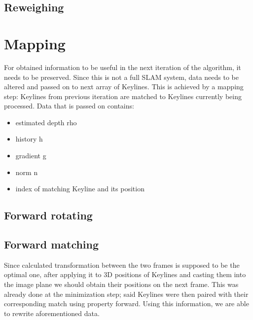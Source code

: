 \subsection{Reweighing}


\section{Mapping}

For obtained information to be useful in the next iteration of the algorithm, it needs to be preserved. Since this is not a full SLAM system, data needs to be altered and passed on to next array of Keylines. This is achieved by a mapping step: Keylines from previous iteration are matched to Keylines currently being processed. Data that is passed on contains:

\begin{itemize}
	\item estimated depth rho
	\item history h
	\item gradient g
	\item norm n
	\item index of matching Keyline and its position
\end{itemize}

\subsection{Forward rotating}

%
%
%

\subsection{Forward matching}

%
%
Since calculated transformation between the two frames is supposed to be the optimal one, after applying it to 3D positions of Keylines and casting them into the image plane we should obtain their positions on the next frame. This was already done at the minimization step; said Keylines were then paired with their corresponding match using property forward. Using this information, we are able to rewrite aforementioned data.

